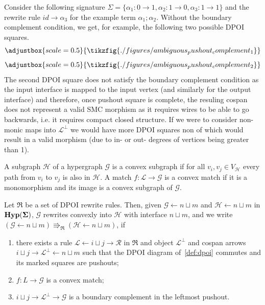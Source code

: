\begin{exa}
	Consider the following signature $\Sigma = \{\alpha_1 : 0 \to 1, \alpha_2 : 1 \to 0, \alpha_3 : 1 \to 1\}$ and the rewrite rule $id \to \alpha_3$ for the example term $\alpha_1;\alpha_2$.
	Without the boundary complement condition, we get, for example, the following two possible DPOI squares.
	\[
		\adjustbox{scale=0.5}{
			\tikzfig{./figures/ambiguous_pushout_complement_1}
		}
	\]
	\[
		\adjustbox{scale=0.5}{
			\tikzfig{./figures/ambiguous_pushout_complement_2}
		}
	\]
	The second DPOI square does not satisfy the boundary complement condition as the input interface is mapped to the input vertex (and similarly for the output interface) and therefore, once pushout square is complete, the resuling cospan does not represent a valid SMC morphism as it requires wires to be able to go backwards, i.e. it requires compact closed structure.
	If we were to consider non-monic maps into $\mathcal{L}^{\bot}$ we would have more DPOI squares non of which would result in a valid morphism (due to in- or out- degrees of vertices being greater than 1).
\end{exa}

\begin{defi}
	A subgraph $\mathcal{H}$ of a hypergraph $\mathcal{G}$ is a convex subgraph if for all $v_i, v_j \in V_{\mathcal{H}}$ every path from $v_i$ to $v_j$ is also in $\mathcal{H}$.
	A match $f\colon \mathcal{L} \to \mathcal{G}$ is a convex match if it is a monomorphism and its image is a convex subgraph of $\mathcal{G}$.
\end{defi}

\begin{defi}%
	\label{def:convex_dpo}
	Let $\mathfrak{R}$ be a set of DPOI rewrite rules.
	Then, given $\mathcal{G} \xleftarrow{} n \sqcup m$ and $\mathcal{H} \xleftarrow{} n \sqcup m$ in $\mathbf{Hyp(\Sigma)}$, $\mathcal{G}$ rewrites convexly into $\mathcal{H}$ with interface $n \sqcup m$, and we write $(\mathcal G \xleftarrow{} n \sqcup m ) \Rrightarrow_{\mathfrak{R}}  (\mathcal H \xleftarrow{} n \sqcup m )$, if
	\begin{enumerate}
		\item there exists a rule $\mathcal{L} \xleftarrow{} i \sqcup j \xrightarrow{} \mathcal{R}$ in $\mathfrak{R}$ and object $\mathcal{L}^{\bot}$ and cospan arrows $i \sqcup j \xrightarrow{} \mathcal{L}^{\bot} \xleftarrow{} n \sqcup m$ such that the DPOI diagram of~\autoref{def:dpoi} commutes and its marked squares are pushouts;
		\item $f\colon L \to \mathcal G$ is a convex match;
		\item $i \sqcup j \to \mathcal{L}^{\bot} \to \mathcal G$ is a boundary complement in the leftmost pushout.
	\end{enumerate}
\end{defi}

